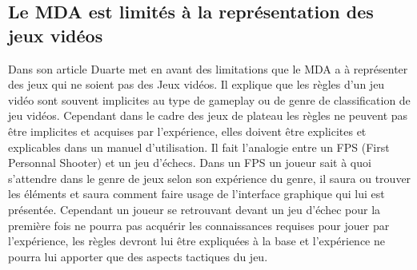 \subsection{Le MDA est limités à la représentation des jeux vidéos}
Dans son article Duarte \cite{GAMA_MDA} met en avant des limitations que le MDA a à représenter des jeux qui ne soient pas des Jeux vidéos. Il explique que les règles d'un jeu vidéo sont souvent implicites au type de gameplay ou de genre de classification de jeu vidéos. Cependant dans le cadre des jeux de plateau les règles ne peuvent pas être implicites et acquises par l'expérience, elles doivent être explicites et explicables dans un manuel d'utilisation. Il fait l'analogie entre un FPS (First Personnal Shooter) et un jeu d'échecs. Dans un FPS un joueur sait à quoi s'attendre dans le genre de jeux selon son expérience du genre, il saura ou trouver les éléments et saura comment faire usage de l'interface graphique qui lui est présentée. Cependant un joueur se retrouvant devant un jeu d'échec pour la première fois ne pourra pas acquérir les connaissances requises pour jouer par l'expérience, les règles devront lui être expliquées à la base et l'expérience ne pourra lui apporter que des aspects tactiques du jeu.